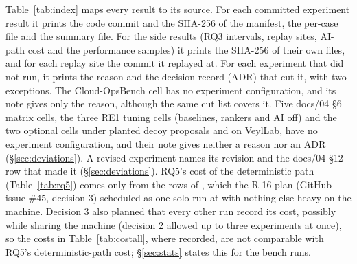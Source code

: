 Table~\ref{tab:index} maps every result to its source.
For each committed experiment result it prints the code commit and the SHA-256 of the manifest, the per-case file and the summary file.
For the side results (RQ3 intervals, replay sites, AI-path cost and the performance samples) it prints the SHA-256 of their own files, and for each replay site the commit it replayed at.
For each experiment that did not run, it prints the reason and the decision record (ADR) that cut it, with two exceptions.
The Cloud-OpsBench  cell has no experiment configuration, and its note gives only the reason, although the same cut list covers it.
Five docs/04 §6 matrix cells, the three RE1 tuning cells (baselines, rankers and AI off) and the two optional  cells under planted decoy proposals and on VeylLab, have no experiment configuration, and their note gives neither a reason nor an ADR (\S\ref{sec:deviations}).
A revised experiment names its revision and the docs/04 §12 row that made it (\S\ref{sec:deviations}).
RQ5's cost of the deterministic path (Table~\ref{tab:rq5}) comes only from the  rows of , which the R-16 plan (GitHub issue \#45, decision 3) scheduled as one solo run at  with nothing else heavy on the machine.
Decision 3 also planned that every other run record its cost, possibly while sharing the machine (decision 2 allowed up to three experiments at once), so the costs in Table~\ref{tab:costall}, where recorded, are not comparable with RQ5's deterministic-path cost; \S\ref{sec:stats} states this for the bench runs.


